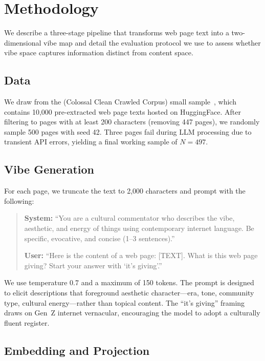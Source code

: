 \section{Methodology}
\label{sec:method}

We describe a three-stage pipeline that transforms web page text into a two-dimensional vibe map and detail the evaluation protocol we use to assess whether vibe space captures information distinct from content space.

\subsection{Data}
\label{sec:data}

We draw from the \cfour (Colossal Clean Crawled Corpus) small sample~\cite{raffel2020exploring}, which contains 10{,}000 pre-extracted web page texts hosted on HuggingFace.
After filtering to pages with at least 200 characters (removing 447 pages), we randomly sample 500 pages with seed 42.
Three pages fail during LLM processing due to transient API errors, yielding a final working sample of $N{=}497$.

\subsection{Vibe Generation}
\label{sec:vibe_gen}

For each page, we truncate the text to 2{,}000 characters and prompt \gptfour with the following:

\begin{quote}
\small
\textbf{System:} ``You are a cultural commentator who describes the vibe, aesthetic, and energy of things using contemporary internet language. Be specific, evocative, and concise (1--3 sentences).''

\textbf{User:} ``Here is the content of a web page: [TEXT]. What is this web page giving? Start your answer with `it's giving'.''
\end{quote}

We use temperature 0.7 and a maximum of 150 tokens.
The prompt is designed to elicit descriptions that foreground aesthetic character---era, tone, community type, cultural energy---rather than topical content.
The ``it's giving'' framing draws on Gen~Z internet vernacular, encouraging the model to adopt a culturally fluent register.

\subsection{Embedding and Projection}
\label{sec:embedding}

